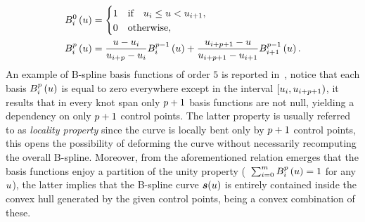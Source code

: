 \begin{equation*}
    \begin{split}
        B_i^0 \left( u \right) & =
        \begin{cases}
            \begin{matrix}
                1 & \text{if} & u_i \le u < u_{i+1},
            \end{matrix} \\
            \begin{matrix}
                0 & \text{otherwise},
            \end{matrix} \\
        \end{cases} \\
        B_i^{p} \left( u \right) & = \frac{u - u_i}{u_{i+p} - u_i}
        B_{i}^{p-1} \left( u \right)
        + \frac{u_{i+p+1} - u}{u_{i+p+1} - u_{i+1}} B_{i+1}^{p-1} \left( u \right).
    \end{split}
\end{equation*}
An example of B-spline basis functions of order $5$ is reported in~, notice that each basis $B_i^{p} \left( u \right)$
is equal to zero everywhere except in the interval $\left[ u_i,  u_{i+p+1} \right)$, it results that in every knot span only $p+1$ basis
functions are not null, yielding a dependency on only $p+1$ control points. The latter property is usually referred to as \emph{locality property}
since the curve is locally bent only by $p+1$ control points, this opens the possibility of deforming the curve without necessarily 
recomputing the overall B-spline. Moreover, from the aforementioned relation emerges that the basis functions enjoy a partition of the unity
property (\ie~$\sum_{i=0}^{m} B_i^{p} \left( u \right) = 1$ for any $u$), the latter implies that the B-spline
curve $\boldsymbol{s}(u)$ is entirely contained inside the convex hull generated by the given control points, being a convex combination of these.

